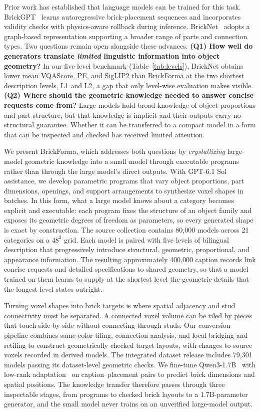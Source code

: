 Prior work has established that language models can be trained for this task. BrickGPT~\cite{brickgpt} learns autoregressive brick-placement sequences and incorporates validity checks with physics-aware rollback during inference. BrickNet~\cite{bricknet} adopts a graph-based representation supporting a broader range of parts and connection types. Two questions remain open alongside these advances. \textbf{(Q1) How well do generators translate \emph{limited} linguistic information into object geometry?} In our five-level benchmark (Table~\ref{tab:levels}), BrickNet obtains lower mean VQAScore, PE, and SigLIP2 than BrickForma at the two shortest description levels, L1 and L2, a gap that only level-wise evaluation makes visible. \textbf{(Q2) Where should the geometric knowledge needed to answer concise requests come from?} Large models hold broad knowledge of object proportions and part structure, but that knowledge is implicit and their outputs carry no structural guarantee. Whether it can be transferred to a compact model in a form that can be inspected and checked has received limited attention.

We present BrickForma, which addresses both questions by \emph{crystallizing} large-model geometric knowledge into a small model through executable programs rather than through the large model's direct outputs. With GPT-6.1 Sol assistance, we develop parametric programs that vary object proportions, part dimensions, openings, and support arrangements to synthesize voxel shapes in batches. In this form, what a large model knows about a category becomes explicit and executable: each program fixes the structure of an object family and exposes its geometric degrees of freedom as parameters, so every generated shape is exact by construction. The source collection contains 80,000 models across 21 categories on a $48^3$ grid. Each model is paired with five levels of bilingual description that progressively introduce structural, geometric, proportional, and appearance information. The resulting approximately 400,000 caption records link concise requests and detailed specifications to shared geometry, so that a model trained on them learns to supply at the shortest level the geometric details that the longest level states outright.

Turning voxel shapes into brick targets is where spatial adjacency and stud connectivity must be separated. A connected voxel volume can be tiled by pieces that touch side by side without connecting through studs. Our conversion pipeline combines same-color tiling, connection analysis, and local bridging and retiling to construct geometrically checked target layouts, with changes to source voxels recorded in derived models. The integrated dataset release includes 79,301 models passing its dataset-level geometric checks. We fine-tune Qwen3-1.7B~\cite{qwen3} with low-rank adaptation~\cite{lora} on caption--placement pairs to predict brick dimensions and spatial positions. The knowledge transfer therefore passes through three inspectable stages, from programs to checked brick layouts to a 1.7B-parameter generator, and the small model never trains on an unverified large-model output.

